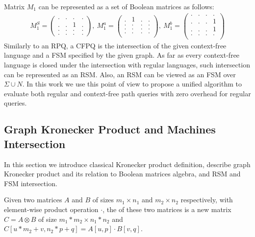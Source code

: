 Matrix $M_1$ can be represented as a set of Boolean matrices as follows:
{\small
\begin{align*}
M_1^S =
\begin{pmatrix}      
    . & . & . & .   \\
    . & . & 1 & .   \\
    . & . & . & .   \\
    . & . & . & .   
\end{pmatrix},~M_1^a =
\begin{pmatrix}       
   . & 1 & . & .   \\
   . & . & . & .   \\
   . & . & . & .   \\
   . & . & . & .   \\
\end{pmatrix},~M_1^b =
\begin{pmatrix}      
    . & . & . & .   \\
    . & . & . & 1   \\
    . & . & . & 1   \\
    . & . & . & .   \\
\end{pmatrix}
\end{align*}
}
Similarly to an RPQ, a CFPQ is the intersection of the given context-free language and a FSM specified by the given graph.
As far as every context-free language is closed under the intersection with regular languages, such intersection can be represented as an RSM.
Also, an RSM can be viewed as an FSM over $\Sigma \cup N$.
In this work we use this point of view to propose a unified algorithm to evaluate both regular and context-free path queries with zero overhead for regular queries.

\subsection{Graph Kronecker Product and Machines Intersection}

In this section we introduce classical Kronecker product definition,
describe graph Kronecker product and its relation to Boolean matrices algebra, 
and RSM and FSM intersection.

\begin{definition}
Given two matrices $A$ and $B$ of sizes $m_1 \times n_1$ and $m_2 \times n_2$ 
respectively, with element-wise product operation $\cdot$, the  of these two matrices is a new matrix $C = A \otimes B$ of size $m_1 * m_2 \times n_1 * n_2$ and $C[u * m_2 + v,n_2 * p + q] = A[u,p] \cdot B[v,q]$.
\end{definition}

